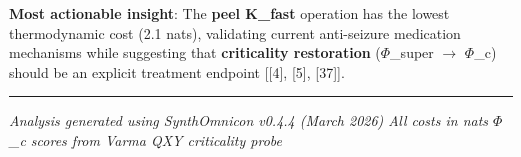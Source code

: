 \documentclass[12pt,a4paper]{article}
\begin{document}
\textbf{Most actionable insight}: The \textbf{peel K\_fast} operation has the lowest thermodynamic cost (2.1 nats), validating current anti-seizure medication mechanisms while suggesting that \textbf{criticality restoration} ($\Phi$\_super $\rightarrow$ $\Phi$\_c) should be an explicit treatment endpoint {[}{[}4{]}, {[}5{]}, {[}37{]}{]}.

\begin{center}
\rule{0.5\textwidth}{0.4pt}
\end{center}

\emph{Analysis generated using SynthOmnicon v0.4.4 (March 2026) \textbar{} All costs in nats \textbar{} $\Phi$\_c scores from Varma QXY criticality probe}
\end{document}

